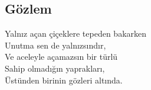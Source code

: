 \subsection{Gözlem}

Yalnız açan çiçeklere tepeden bakarken \\
Unutma sen de yalnızsındır, \\
Ve aceleyle açamazsın bir türlü \\
Sahip olmadığın yaprakları, \\
Üstünden birinin gözleri altında.
